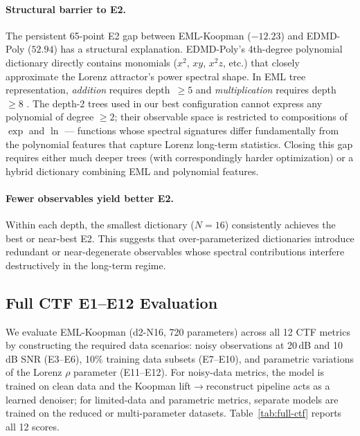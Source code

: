 \documentclass[11pt]{article}
\begin{document}
\paragraph{Structural barrier to E2.}
The persistent 65-point E2 gap between EML-Koopman ($-12.23$) and EDMD-Poly
($52.94$) has a structural explanation.  EDMD-Poly's 4th-degree polynomial
dictionary directly contains monomials ($x^2$, $xy$, $x^2 z$, etc.) that
closely approximate the Lorenz attractor's power spectral shape.  In EML tree
representation, \emph{addition} requires depth~$\ge 5$ and \emph{multiplication}
requires depth~$\ge 8$ \citep{odrzywołek2026}.  The depth-2 trees used in our
best configuration cannot express any polynomial of degree $\ge 2$; their
observable space is restricted to compositions of $\exp$ and $\ln$ --- functions
whose spectral signatures differ fundamentally from the polynomial features that
capture Lorenz long-term statistics.  Closing this gap requires either much
deeper trees (with correspondingly harder optimization) or a hybrid dictionary
combining EML and polynomial features.

\paragraph{Fewer observables yield better E2.}
Within each depth, the smallest dictionary ($N\!=\!16$) consistently achieves
the best or near-best E2.  This suggests that over-parameterized dictionaries
introduce redundant or near-degenerate observables whose spectral contributions
interfere destructively in the long-term regime.


\subsection{Full CTF E1--E12 Evaluation}
\label{sec:full-ctf}

We evaluate EML-Koopman (d2-N16, 720 parameters) across all 12 CTF metrics
by constructing the required data scenarios: noisy observations at 20\,dB and
10\,dB SNR (E3--E6), 10\% training data subsets (E7--E10), and parametric
variations of the Lorenz $\rho$ parameter (E11--E12).  For noisy-data metrics,
the model is trained on clean data and the Koopman lift$\to$reconstruct pipeline
acts as a learned denoiser; for limited-data and parametric metrics, separate
models are trained on the reduced or multi-parameter datasets.
Table~\ref{tab:full-ctf} reports all 12 scores.
\end{document}
